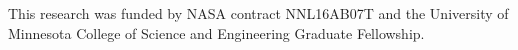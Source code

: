 \begin{comment}
Currently, the Safety Annex only supports monolithic analysis with respect to probabilistic analysis. Compositional fault analysis is of interest for the following reasons. 
\begin{itemize}
\item Scalability of compositional analysis~\cite{NFM2012:CoGaMiWhLaLu, hilt2013:MuWhRaHe}.
\item Given fault probabilities, what is the top level threshold for the system?
\item Compositional fault tree generation that reflects the fault model, the system architecture, and the system behavior.
\item What is the maximum number of active faults that a system can tolerate and what are those faults?
\end{itemize}

To this end University of Minnesota and Rockwell Collins have been focusing on recent developments in model checking in order to perform compositional fault analysis and generate these artifacts of interest. 

In this research, an extension to the AADL language has been developed with tool support for formal analysis of system safety properties in the presence of faults. Faulty behavior is specified as an extension of the nominal model, allowing safety analysis and system implementation to be driven from a single common model. This new Safety Annex leverages the AADL structural model and nominal behavioral specification (using the AGREE annex) to propagate faulty component behaviors without the need to add separate propagation specifications to the model.   Next steps will include extensions to automate injection of Byzantine faults as well as automatic generation of fault trees.  For more details on the tool, models, and approach, see the technical report~\cite{SATechReport}. To access the tool plugin, users manual, or models, see the repository~\cite{SAGithub}. 
\end{comment}

\vspace{2 mm}
 This research was funded by NASA contract NNL16AB07T and the University of Minnesota College of Science and Engineering Graduate Fellowship.


